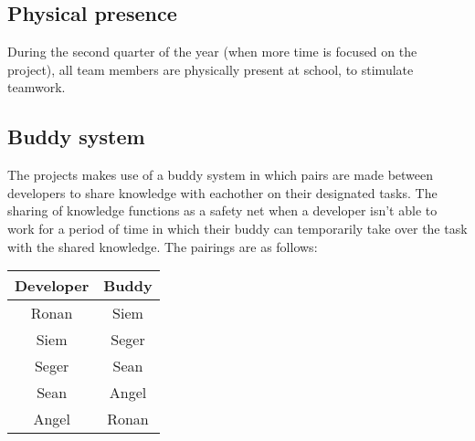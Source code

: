 \documentclass{article} %
\begin{document}
\subsection{Physical presence}
During the second quarter of the year (when more time is focused on the project), all team members are physically present at school, to stimulate teamwork.


\subsection{Buddy system}
The projects makes use of a buddy system in which pairs are made between developers to share knowledge with eachother on their designated tasks. The sharing of knowledge functions as a safety net when a developer isn't able to work for a period of time in which their buddy can temporarily take over the task with the shared knowledge. The pairings are as follows:

\begin{center}
\begin{tabular}{|c|c|}
  \hline
  \textbf{Developer} & \textbf{Buddy} \\
  \hline
  Ronan & Siem \\
  \hline
  Siem & Seger \\
  \hline
  Seger & Sean \\
  \hline
  Sean & Angel \\
  \hline 
  Angel & Ronan \\
  \hline
\end{tabular}
\end{center}
\end{document}
